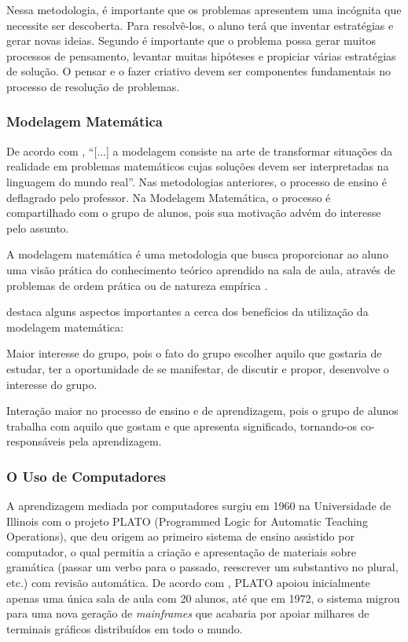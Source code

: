 Nessa metodologia, é importante que os problemas apresentem uma incógnita que necessite ser descoberta. Para resolvê-los, o aluno terá que inventar estratégias e gerar novas ideias. Segundo  é importante que o problema possa gerar muitos processos de pensamento, levantar muitas hipóteses e propiciar várias estratégias de solução. O pensar e o fazer criativo devem ser componentes fundamentais no processo de resolução de problemas.

\subsubsection{Modelagem Matemática}

De acordo com , “[...] a modelagem consiste na arte de transformar situações da realidade em problemas matemáticos cujas soluções devem ser interpretadas na linguagem do mundo real”. Nas metodologias anteriores, o processo de ensino é deflagrado pelo professor. Na Modelagem Matemática, o processo é compartilhado com o grupo de alunos, pois sua motivação advém
do interesse pelo assunto. 

A modelagem matemática é uma metodologia que busca proporcionar ao aluno uma visão prática do conhecimento teórico aprendido na sala de aula, através de problemas de ordem prática ou de natureza empírica \cite{fossa1998tendencias}. 

 destaca alguns aspectos importantes a cerca dos benefícios da utilização da modelagem matemática:

\begin{alineascomponto}
	\item Maior interesse do grupo, pois o fato do grupo escolher aquilo que gostaria de estudar, ter a oportunidade de se manifestar, de discutir e propor, desenvolve o interesse do grupo.
    \item Interação maior no processo de ensino e de aprendizagem, pois o grupo de alunos trabalha com aquilo que gostam e que apresenta significado, tornando-os co-responsáveis pela aprendizagem. 
\end{alineascomponto}


\subsubsection{O Uso de Computadores}

A aprendizagem mediada por computadores surgiu em 1960 na Universidade de Illinois com o projeto PLATO (Programmed Logic for Automatic Teaching Operations)\cite{bitzer1961plato}, que deu origem ao 
primeiro sistema de ensino assistido por computador, o qual permitia a criação e apresentação de materiais sobre gram\'atica (passar um verbo para o passado, reescrever um substantivo no plural, 
etc.) com revisão automática. De acordo com , PLATO apoiou inicialmente apenas uma única sala de aula com 20 alunos, até que em 1972, o sistema migrou para uma nova 
geração de \textit{mainframes} que acabaria por apoiar milhares de terminais gráficos distribuídos em todo o mundo.

